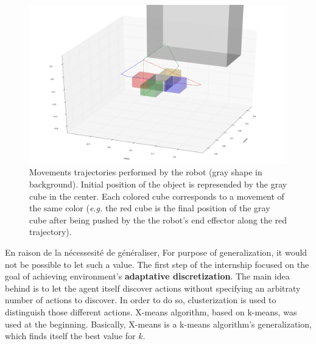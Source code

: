 \documentclass{llncs}
\begin{document}
\begin{figure}
	\centering
	\includegraphics[width=\textwidth]{figures/trajectories}
	\caption{Movements trajectories performed by the robot (gray shape in background). Initial position of the object is represended by the gray cube in the center. Each colored cube corresponds to a movement of the same color (\textit{e.g.} the red cube is the final position of the gray cube after being pushed by the the robot's end effector along the red trajectory).}
	\label{fig:trajectories}
\end{figure}

En raison de la nécessesité de généraliser,
For purpose of generalization, it would not be possible to let such a value. The first step of the internship focused on the goal of achieving environment's \textbf{adaptative discretization}. The main idea behind is to let the agent itself discover actions without specifying an arbitraty number of actions to discover.  In order to do so, clusterization is used to distinguish those different actions. X-means algorithm\cite{Pelleg:2000:XEK:645529.657808}, based on k-means, was used at the beginning. Basically, X-means is a k-means algorithm's generalization, which finds itself the best value for $k$.

%
\end{document}
